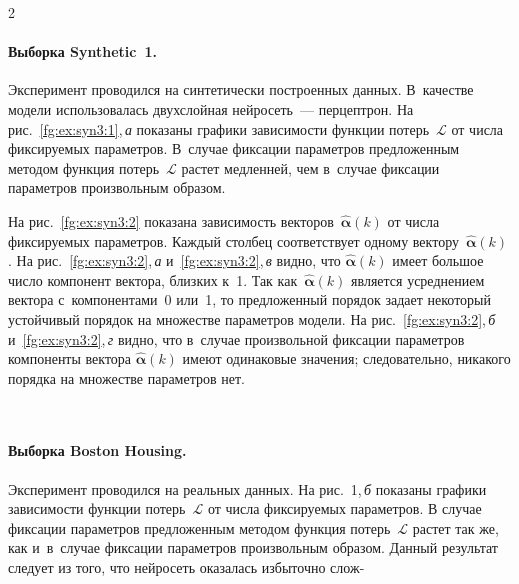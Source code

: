 \begin{multicols}{2}
\paragraph*{Выборка Synthetic~1.}
Эксперимент проводился на синтетически построенных данных. В~качестве 
модели использовалась двухслойная нейросеть~--- перцептрон.
На рис.~\ref{fg:ex:syn3:1},\,\textit{а} показаны графики за\-ви\-си\-мости 
функции 
потерь~$\mathcal{L}$ от числа фик\-си\-ру\-емых па\-ра\-мет\-ров. В~случае фиксации 
параметров предложенным методом функция потерь~$\mathcal{L}$ растет 
медленней, чем в~случае фиксации параметров произвольным образом.

На рис.~\ref{fg:ex:syn3:2} показана зависимость 
векторов~$\hat{\boldsymbol{\alpha}}(k)$ от числа фиксируемых параметров. 
Каждый столбец соответствует одному 
вектору~$\hat{\boldsymbol{\alpha}}(k)$. На 
рис.~\ref{fg:ex:syn3:2},\,\textit{а} и~\ref{fg:ex:syn3:2},\,\textit{в} 
видно, что $\hat{\boldsymbol{\alpha}}(k)$ имеет большое число компонент 
вектора, близких к~1. Так как~$\hat{\boldsymbol{\alpha}}(k)$ является 
усреднением вектора с~компонентами~0 или~1, то предложенный порядок 
задает некоторый устойчивый порядок на множестве параметров модели. На 
рис.~\ref{fg:ex:syn3:2},\,\textit{б} и~\ref{fg:ex:syn3:2},\,\textit{г} 
видно, что в~случае произвольной фиксации параметров компоненты вектора 
$\hat{\boldsymbol{\alpha}}(k)$ имеют одинаковые значения; следовательно, 
никакого порядка на множестве параметров нет.

\begin{figure*} %
\vspace*{1pt}
 \begin{center}
 \mbox{%
 \epsfxsize=155.885mm 
 }
 \end{center}
\vspace*{-9pt}
\label{fg:ex:syn3:1}
\end{figure*}

\paragraph*{Выборка Boston Housing.}
Эксперимент проводился на реальных данных.
На рис.~1,\,\textit{б} показаны графики зависимости функции 
потерь~$\mathcal{L}$ от числа фиксируемых параметров. В случае фиксации 
параметров предложенным методом функция потерь~$\mathcal{L}$ растет так 
же, как и~в~случае фиксации параметров произвольным образом.
Данный результат следует из того, что нейросеть оказалась избыточно 
слож-\linebreak\vspace*{-12pt}

\pagebreak

\end{multicols}





